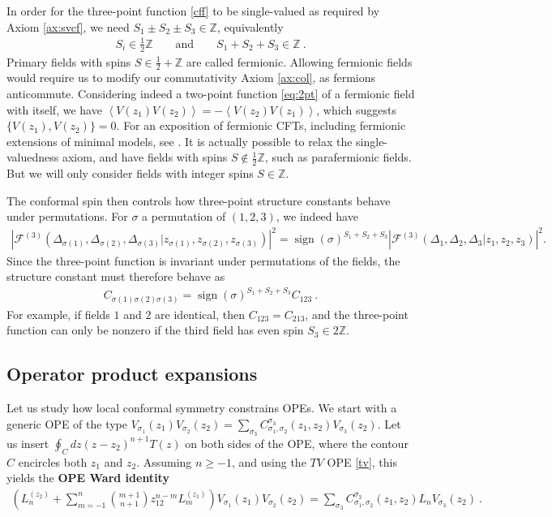 \documentclass[12pt, a4paper, notitlepage, twoside]{report}
\numberwithin{equation}{section}
\theoremstyle{break}
\begin{document}
In order for the three-point function \eqref{cff} to be single-valued as required by Axiom \ref{ax:svcf}, we need $S_1\pm S_2\pm S_3 \in\mathbb{Z}$, equivalently
\begin{align}
 \boxed{S_i \in \frac12{\mathbb{Z}} \qquad \text{and} \qquad S_1+S_2+S_3\in\mathbb{Z}}\ .
\label{dbdz}
\end{align}
Primary fields with spins $S\in\frac12+\mathbb{Z}$ are called fermionic. Allowing fermionic fields would require us to modify our commutativity Axiom \ref{ax:col}, as fermions anticommute. Considering indeed a two-point function \eqref{eq:2pt} of a fermionic field with itself, we have $\left< V(z_1)V(z_2)\right> = -\left<V(z_2)V(z_1)\right>$, which suggests $\{V(z_1),V(z_2)\}=0$. For an exposition of fermionic CFTs, including fermionic extensions of minimal models, see \cite{rw20}.
It is actually possible to relax the single-valuedness axiom, and have fields with spins $S\notin \frac12\mathbb{Z}$, such as parafermionic fields. But we will only consider fields with integer spins $S\in\mathbb{Z}$.

The conformal spin then controls how three-point structure constants behave under permutations. For $\sigma$ a permutation of $(1,2,3)$, we indeed have 
\begin{align}
 \left|\mathcal{F}^{(3)}(\Delta_{\sigma(1)},\Delta_{\sigma(2)},\Delta_{\sigma(3)}|z_{\sigma(1)},z_{\sigma(2)},z_{\sigma(3)})\right|^2 = \operatorname{sign}(\sigma)^{S_1+S_2+S_3} \left|\mathcal{F}^{(3)}(\Delta_1,\Delta_2,\Delta_3|z_1,z_2,z_3)\right|^2 .
\end{align}
Since the three-point function is invariant under permutations of the fields, the structure constant must therefore behave as 
\begin{align}
 \boxed{ C_{\sigma(1)\sigma(2)\sigma(3)} = \operatorname{sign}(\sigma)^{S_1+S_2+S_3} C_{123} }\ .
 \label{css}
\end{align}
For example, if fields $1$ and $2$ are identical, then $C_{123}=C_{213}$, and the three-point function can only be nonzero if the third field has even spin $S_3\in 2\mathbb{Z}$.


\subsection{Operator product expansions \label{secope}}

Let us study how local conformal symmetry constrains OPEs. We start with a generic OPE of the type $V_{\sigma_1}(z_1)V_{\sigma_2}(z_2) = \sum_{\sigma_3} C_{\sigma_1,\sigma_2}^{\sigma_3}(z_1,z_2) V_{\sigma_3}(z_2)$. Let us insert $\oint_C dz (z-z_2)^{n+1} T(z)$ on both sides of the OPE, where the contour $C$ encircles both $z_1$ and $z_2$. Assuming $n\geq -1$, and using the $TV$ OPE \eqref{tv}, this yields the \textbf{OPE Ward identity}
\begin{align}
 \left(L_n^{(z_2)}+\sum_{m=-1}^{n}\binom{m+1}{n+1} z_{12}^{n-m}L_{m}^{(z_1)}\right)V_{\sigma_1}(z_1)V_{\sigma_2}(z_2) = \sum_{\sigma_3} C_{\sigma_1,\sigma_2}^{\sigma_3}(z_1,z_2) L_n V_{\sigma_3}(z_2)\ .
\end{align}
\end{document}
